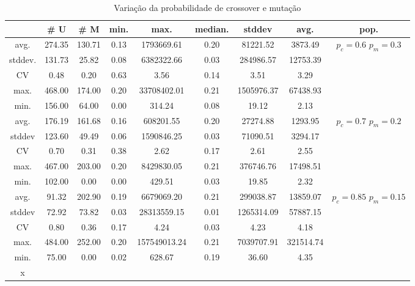 \documentclass[a4paper]{paper}
\begin{document}
\begin{table}
  \center
  \caption{Variação da probabilidade de crossover e mutação}
  \label{tbl:var_cross_mut}
  \begin{tabular}{| c | c | c | c | c | c | c | c | c |}
    \hline
    &  \# U & \# M & min. & max. & median. & stddev & avg. & pop. \\ \hline
    avg.    & 274.35 & 130.71 & 0.13 & 1793669.61 & 0.20 & 81221.52 & 3873.49 &  \\ 
    stddev. & 131.73 & 25.82 & 0.08 & 6382322.66 & 0.03 & 284986.57 & 12753.39 & \\ 
    CV      & 0.48 & 0.20 & 0.63 & 3.56 & 0.14 & 3.51 & 3.29 & \\ 
    max.    & 468.00 & 174.00 & 0.20 & 33708402.01 & 0.21 & 1505976.37 & 67438.93 & \\ 
    min.    & 156.00 & 64.00 & 0.00 & 314.24 & 0.08 & 19.12 & 2.13 & \\ \hline \hline
    avg.    & 176.19 & 161.68 & 0.16 & 608201.55 & 0.20 & 27274.88 & 1293.95 &  \\ 
    stddev  & 123.60 & 49.49 & 0.06 & 1590846.25 & 0.03 & 71090.51 & 3294.17 & \\ 
    CV      & 0.70 & 0.31 & 0.38 & 2.62 & 0.17 & 2.61 & 2.55 & \\ 
    max.    & 467.00 & 203.00 & 0.20 & 8429830.05 & 0.21 & 376746.76 & 17498.51 & \\ 
    min.    & 102.00 & 0.00 & 0.00 & 429.51 & 0.03 & 19.85 & 2.32 & \\ \hline \hline
    avg.    & 91.32 & 202.90 & 0.19 & 6679069.20 & 0.21 & 299038.87 & 13859.07 &  \\ 
    stddev  & 72.92 & 73.82 & 0.03 & 28313559.15 & 0.01 & 1265314.09 & 57887.15 & \\ 
    CV      & 0.80 & 0.36 & 0.17 & 4.24 & 0.03 & 4.23 & 4.18 & \\ 
    max.    & 484.00 & 252.00 & 0.20 & 157549013.24 & 0.21 & 7039707.91 & 321514.74 & \\ 
    min.    & 75.00 & 0.00 & 0.02 & 628.67 & 0.19 & 36.60 & 4.35 & \\ \hline x
  \end{tabular}
\end{table}
\end{document}
